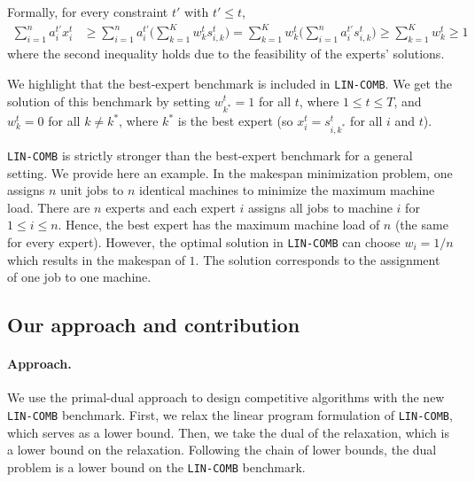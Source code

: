 \noindent Formally, for every constraint $t'$ with $t' \leq t$,
%
\begin{align*}
	\sum_{i=1}^{n} a_{i}^{t'} x_{i}^{t} &\geq
	\sum_{i=1}^{n} a_{i}^{t'} \biggl( \sum_{k=1}^{K} w_{k}^{t} s_{i,k}^{t} \biggr)
	= \sum_{k=1}^{K} w_{k}^{t}  \biggl( \sum_{i=1}^{n} a_{i}^{t'} s_{i,k}^{t} \biggr)
	 \geq \sum_{k=1}^{K} w_{k}^{t} \geq 1
\end{align*}
%
where the second inequality holds due to the feasibility of the experts' solutions.
%

We highlight that the best-expert benchmark is included in \texttt{LIN-COMB}. We get the solution of this benchmark by setting $w^{t}_{k^{*}} = 1$ for all $t$, where $1 \leq t \leq T$, and $w^{t}_{k} = 0$ for all $k \neq k^{*}$,
where $k^{*}$ is the best expert (so $x_{i}^{t} = s_{i,k^{*}}^{t}$ for all $i$ and $t$).

\texttt{LIN-COMB} is strictly stronger than the best-expert benchmark for a general setting. We provide here an example.
In the makespan minimization problem, one assigns $n$ unit jobs to $n$ identical machines to minimize the maximum machine load.
There are $n$ experts and each expert $i$ assigns all jobs to machine $i$ for $1 \leq i \leq n$. Hence, the best expert has the maximum machine load of $n$ (the same for every expert). However, the optimal solution in \texttt{LIN-COMB} can choose $w_{i} = 1/n$ which results in the makespan of $1$. The solution corresponds to the assignment of one job to one machine.

\subsection{Our approach and contribution}

\paragraph{Approach.} We use the primal-dual approach to design competitive algorithms with the new \texttt{LIN-COMB} benchmark. First, we relax the linear program formulation of \texttt{LIN-COMB}, which serves as a lower bound. Then, we take the dual of the relaxation, which is a lower bound on the relaxation. Following the chain of lower bounds, the dual problem is a lower bound on the \texttt{LIN-COMB} benchmark.

